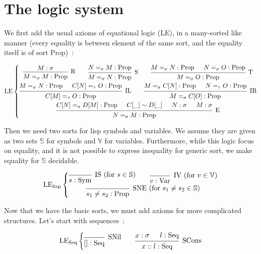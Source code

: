 \documentclass[]{article}
\newcommand{\V}{\mathscr{V}}
\newcommand{\1}{\mathbbm{1}}
\newcommand{\0}{\mathbbm{0}}
\renewcommand{\S}{\mathbb{S}}
\renewcommand{\V}{\mathbb{V}}
\newcommand{\Prop}{\text{Prop}}
\newcommand{\Sym}{\text{Sym}}
\newcommand{\Var}{\text{Var}}
\newcommand{\Seq}{\text{Seq}}
\newcommand{\proof}[1]{{\scantokens{\begin{prooftree}#1\end{prooftree}}}}
\begin{document}
\section{The logic system}

We first add the usual axioms of equational logic (LE),
in a many-sorted like manner (every equality is between element
of the same sort, and the equality itself is of sort $\Prop$)~:

\[\text{LE}\left\{
\begin{gathered}
\proof{
    \hypo{M : \sigma}
    \infer1[R]{M =_\sigma M : \Prop}
}
\qquad\proof{
    \hypo{ N =_\sigma M : \Prop }
    \infer1[S]{M =_\sigma N : \Prop}
}
\qquad\proof{
    \hypo{M=_\sigma N : \Prop}
    \hypo{N=_\sigma O : \Prop}
    \infer2[T]{M=_\sigma O : \Prop}
} \\
\proof{
    \hypo{M=_\sigma N:\Prop}
    \hypo{C[N]=_\tau O:\Prop}
    \infer2[IL]{C[M]=_\tau O : \Prop}
}
\qquad\proof{
    \hypo{M =_\sigma C[N]:\Prop}
    \hypo{N =_\tau O:\Prop}
    \infer2[IR]{M =_\sigma C[O]:\Prop}
} \\
\proof{
    \hypo{C[N]=_\sigma D[M]:\Prop}
    \hypo{C[\_]\sim D[\_]}
    \hypo{N:\sigma}
    \hypo{M:\sigma}
    \infer4[E]{N=_\sigma M:\Prop}
}
\end{gathered}
\right.
\]

Then we need two sorts for lisp symbols and variables. We assume they
are given as two sets $\S$ for symbols and $\V$ for variables.
Furthermore, while this logic focus on equality, and it is not possible
to express inequality for generic sort, we make equality for $\S$
decidable.

\[\text{LE}_\text{lisp}\left\{
    \begin{gathered}
        \proof{
            \infer0[IS (for $s\in\S$)]{s : \Sym}
        }
        \qquad\proof{
            \infer0[IV (for $v\in\V)$]{v : \Var}
        }\\
        \proof{
            \infer0[SNE (for $s_1\neq s_2\in\S$)]{s_1\neq s_2:\Prop}
        }
    \end{gathered}
\right.\]

Now that we have the basic sorts, we must add axioms for more complicated
structures. Let's start with sequences~:

\[\text{LE}_\text{Seq}\left\{
    \begin{gathered}
        \proof{
            \infer0[SNil]{[]:\Seq}
        }
        \qquad\proof{
            \hypo{x:\sigma}
            \hypo{l:\Seq}
            \infer2[SCons]{x::l : \Seq}
        }
    \end{gathered}
\right.\]
\end{document}
